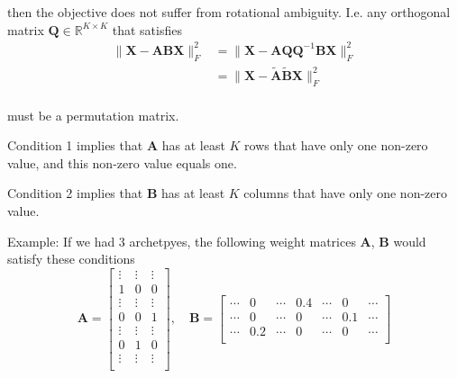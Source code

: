 \documentclass{article}
\begin{document}
then the objective does not suffer from rotational ambiguity. I.e. any orthogonal matrix $\mathbf{Q} \in \mathbb{R}^{K \times K}$ that satisfies
\begin{equation}
    \begin{aligned}
    \| \mathbf{X} - \mathbf{A} \mathbf{B} \mathbf{X}\|_F^2
    &= \| \mathbf{X} - \mathbf{A} \mathbf{Q} \mathbf{Q}^{-1} \mathbf{B} \mathbf{X}\|_F^2 \\
    &= \| \mathbf{X} - \tilde{\mathbf{A}} \tilde{\mathbf{B}} \mathbf{X}\|_F^2 \\
    \end{aligned}
\end{equation}

must be a permutation matrix.

Condition 1 implies that $\mathbf{A}$ has at least $K$ rows that have only one non-zero value, and this non-zero value equals one.

Condition 2 implies that $\mathbf{B}$ has at least $K$ columns that have only one non-zero value.

Example: If we had $3$ archetpyes, the following weight matrices $\mathbf{A}$, $\mathbf{B}$ would satisfy these conditions
\begin{equation}
    \mathbf{A} =
    \left[
        \begin{array}{ccc}
            \vdots & \vdots & \vdots \\
            1 & 0 & 0 \\
            \vdots & \vdots & \vdots \\
            0 & 0 & 1 \\
            \vdots & \vdots & \vdots \\
            0 & 1 & 0 \\
            \vdots & \vdots & \vdots \\
        \end{array}
    \right]
    , \quad
    \mathbf{B} =
    \left[
        \begin{array}{ccccccc}
            \cdots & 0 & \cdots & 0.4 & \cdots & 0 & \cdots \\
            \cdots & 0 & \cdots & 0 & \cdots & 0.1 & \cdots \\
            \cdots & 0.2 & \cdots & 0 & \cdots & 0 & \cdots \\
        \end{array}
    \right]
\end{equation}

\end{document}
